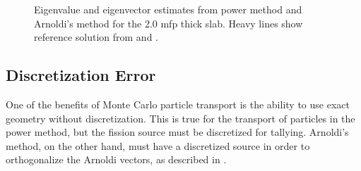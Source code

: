 \begin{comment}
\begin{sidewaysfigure}[hp]\centering
    
    \caption{Fundamental eigenvector estimates from the power method and Arnoldi's method for the 0.2 mfp wide slab.  The heavy line shows the S$_\mathrm{N}$ solution.}
    \label{fig:BasicFundamentalW02}
\end{sidewaysfigure}
\end{comment}

\begin{figure}\centering
    
    \caption{Eigenvalue and eigenvector estimates from power method and Arnoldi's method for the 2.0 mfp thick slab.  Heavy lines show reference solution from \cite{Garis:1991One-s-0} and \cite{Dahl:1979Eigen-0}.}
    
\end{figure}

\begin{comment}
\begin{sidewaysfigure}[hp]\centering
    
    \caption{Fundamental eigenvector estimates from the power method and Arnoldi's method for the 2.0 mfp wide slab.  The heavy line shows the S$_\mathrm{N}$ solution.}
    \label{fig:BasicFundamentalW2}
\end{sidewaysfigure}
\end{comment}

\clearpage
\subsection{Discretization Error \label{sec:DiscretizationBias}} 

One of the benefits of Monte Carlo particle transport is the ability to use exact geometry without discretization.  This is true for the transport of particles in the power method, but the fission source must be discretized for tallying.  Arnoldi's method, on the other hand, must have a discretized source  in order to orthogonalize the Arnoldi vectors, as described in .

